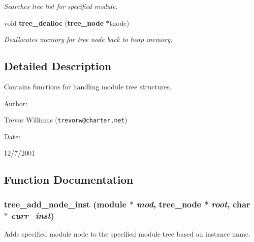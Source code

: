 \begin{CompactItemize}
\begin{CompactList}\small\item\em Searches tree list for specified module.\item\end{CompactList}\item 
void {\bf tree\_\-dealloc} ({\bf tree\_\-node} $\ast$tnode)
\begin{CompactList}\small\item\em Deallocates memory for tree node back to heap memory.\item\end{CompactList}\end{CompactItemize}


\subsection{Detailed Description}
Contains functions for handling module tree structures.



\begin{Desc}
\item[Author: ]\par
Trevor Williams ({\tt trevorw@charter.net}) \end{Desc}
\begin{Desc}
\item[Date: ]\par
12/7/2001\end{Desc}


\subsection{Function Documentation}
\subsubsection{ tree\_\-add\_\-node\_\-inst ({\bf module} $\ast$ {\em mod}, {\bf tree\_\-node} $\ast$ {\em root}, char $\ast$ {\em curr\_\-inst})}\label{tree_8h_a2}


Adds specified module node to the specified module tree based on instance name.

